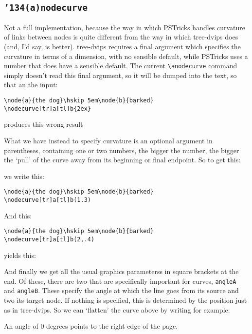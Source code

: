 \documentclass[12pt]{article}
\def\pstricks{PSTricks}
\def\bck{\char'134}
\begin{document}
\subsection{\tt \bck (a)nodecurve}
Not a full implementation, because the way in which {\pstricks} handles
curvature of links between nodes is quite different from the way in which
{\sf tree-dvips} does (and, I'd say, is better).  {\sf tree-dvips} requires
a final argument which specifies the curvature in terms of a dimension,
with no sensible default, while {\pstricks} uses a number that does have
a sensible default.  The current \verb&\anodecurve& command simply doesn't
read this final argument, so it will be dumped into the text, so that an
the input:
\begin{example}
\begin{verbatim}
\node{a}{the dog}\hskip 5em\node{b}{barked}
\nodecurve[tr]a[tl]b{2ex}
\end{verbatim}
\end{example}
produces this wrong result
What we have instead to specify curvature is an optional argument in
parentheses, containing one or two numbers, the bigger the number, the bigger
the `pull' of the curve away from its beginning or final endpoint.  So to
get this:
we write this:
\begin{example}
\begin{verbatim}
\node{a}{the dog}\hskip 5em\node{b}{barked}
\nodecurve[tr]a[tl]b(1.3)
\end{verbatim}
\end{example}
And this:
\begin{example}
\begin{verbatim}
\node{a}{the dog}\hskip 5em\node{b}{barked}
\nodecurve[tr]a[tl]b(2,.4)
\end{verbatim}
\end{example}
yields this:
And finally we get all the usual graphics parameterss in square brackets at
the end.  Of these, there are two that are specifically important for curves,
{\tt angleA} and {\tt angleB}.  These specify the angle at which the line
goes from its source and two its target node.  If nothing is specified,
this is determined by the position just as in {\sf tree-dvips}.  So we
can `flatten' the curve above by writing for example:
An angle of 0 degrees points to the right edge of the page.
\end{document}
